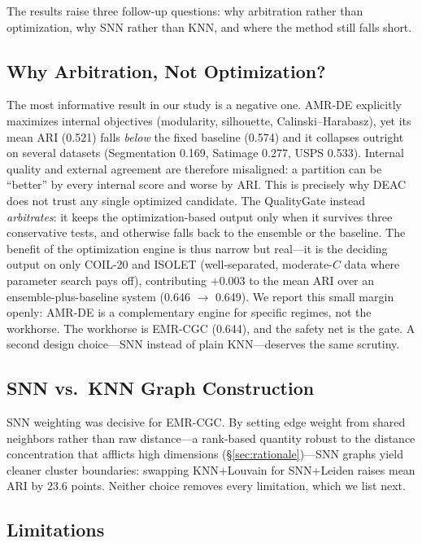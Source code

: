 \documentclass[conference]{IEEEtran}
\begin{document}
The results raise three follow-up questions: why arbitration rather than optimization, why SNN rather than KNN, and where the method still falls short.

\subsection{Why Arbitration, Not Optimization?}

The most informative result in our study is a negative one. AMR-DE
explicitly maximizes internal objectives (modularity, silhouette,
Calinski--Harabasz), yet its mean ARI (0.521) falls \emph{below} the fixed
baseline (0.574) and it collapses outright on several datasets
(Segmentation 0.169, Satimage 0.277, USPS 0.533). Internal quality and
external agreement are therefore misaligned: a partition can be ``better''
by every internal score and worse by ARI. This is precisely why DEAC does
not trust any single optimized candidate. The QualityGate instead
\emph{arbitrates}: it keeps the optimization-based output only when it
survives three conservative tests, and otherwise falls back to the
ensemble or the baseline. The benefit of the optimization engine is thus
narrow but real---it is the deciding output on only COIL-20 and ISOLET
(well-separated, moderate-$C$ data where parameter search pays off),
contributing $+0.003$ to the mean ARI over an ensemble-plus-baseline system
(0.646 $\to$ 0.649). We report this small margin openly: AMR-DE is a
complementary engine for specific regimes, not the workhorse. The workhorse
is EMR-CGC (0.644), and the safety net is the gate. A second design
choice---SNN instead of plain KNN---deserves the same scrutiny.

\subsection{SNN vs.\ KNN Graph Construction}

SNN weighting was decisive for EMR-CGC. By setting edge weight from shared neighbors rather than raw distance---a rank-based quantity robust to the distance concentration that afflicts high dimensions (\S\ref{sec:rationale})---SNN graphs yield cleaner cluster boundaries: swapping KNN+Louvain for SNN+Leiden raises mean ARI by 23.6 points. Neither choice removes every limitation, which we list next.

\subsection{Limitations}
\end{document}
